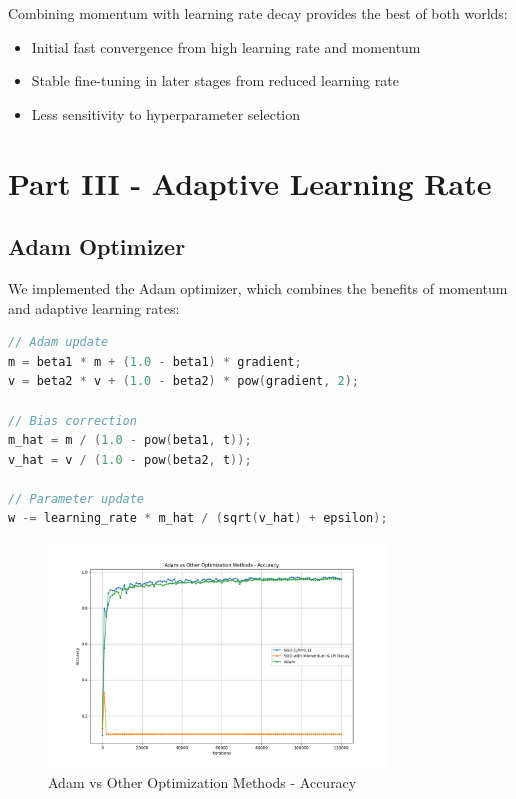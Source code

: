 \documentclass{article}
\begin{document}
Combining momentum with learning rate decay provides the best of both worlds:
\begin{itemize}
    \item Initial fast convergence from high learning rate and momentum
    \item Stable fine-tuning in later stages from reduced learning rate
    \item Less sensitivity to hyperparameter selection
\end{itemize}

\section{Part III - Adaptive Learning Rate}

\subsection{Adam Optimizer}
We implemented the Adam optimizer, which combines the benefits of momentum and adaptive learning rates:

\begin{lstlisting}[language=C]
// Adam update
m = beta1 * m + (1.0 - beta1) * gradient;
v = beta2 * v + (1.0 - beta2) * pow(gradient, 2);

// Bias correction
m_hat = m / (1.0 - pow(beta1, t));
v_hat = v / (1.0 - pow(beta2, t));

// Parameter update
w -= learning_rate * m_hat / (sqrt(v_hat) + epsilon);
\end{lstlisting}

\begin{figure}[h]
\centering
\includegraphics[width=0.8\textwidth]{plots/part3_adam_accuracy.png}
\caption{Adam vs Other Optimization Methods - Accuracy}
\end{figure}
\end{document}
